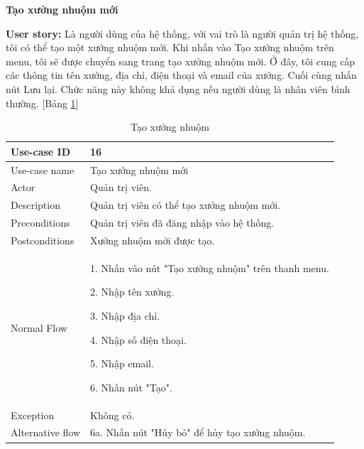 \textbf{Tạo xưởng nhuộm mới}\par
\textbf{User story:} Là người dùng của hệ thống, với vai trò là người quản trị hệ thống, tôi có thể tạo một xưởng nhuộm mới. Khi nhấn vào Tạo xưởng nhuộm trên menu, tôi sẽ được chuyển sang trang tạo xưởng nhuộm mới. Ở đây, tôi cung cấp các thông tin tên xưởng, địa chỉ, điện thoại và email của xưởng. Cuối cùng nhấn nút Lưu lại. Chức năng này không khả dụng nếu người dùng là nhân viên bình thường. [Bảng \ref{bang16}]
\begin{table}[H]
    \centering
    \begin{tabular}{|m{3cm}|m{10cm}|}
    \hline 
        Use-case ID & 16\\ \hline
        Use-case name & Tạo xưởng nhuộm mới\\ \hline
        Actor & Quản trị viên.\\ \hline
        Description & Quản trị viên có thể tạo xưởng nhuộm mới.\\ \hline
        Preconditions & Quản trị viên đã đăng nhập vào hệ thống.\\ \hline
        Postconditions & Xưởng nhuộm mới được tạo.\\ \hline
        Normal Flow & 
        1. Nhấn vào nút "Tạo xưởng nhuộm" trên thanh menu.\par 
        2. Nhập tên xưởng.\par
        3. Nhập địa chỉ.\par
        4. Nhập số điện thoại.\par
        5. Nhập email.\par
        6. Nhấn nút "Tạo".
        \\ \hline
        Exception & Không có.
        \\ \hline
        Alternative flow & 
        6a. Nhấn nút "Hủy bỏ" để hủy tạo xưởng nhuộm.
        \\ 
    \hline 
    \end{tabular}
    \caption{Tạo xưởng nhuộm}
    \label{bang16}
\end{table}



